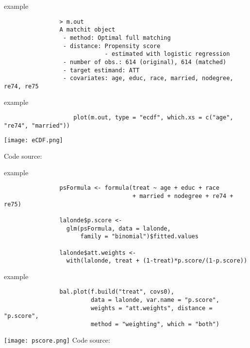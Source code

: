 \documentclass[aspectratio=169]{beamer}
\begin{document}
		\begin{frame}[fragile]{example}
			\begin{verbatim}
				> m.out
				A matchit object
				 - method: Optimal full matching
				 - distance: Propensity score
				             - estimated with logistic regression
				 - number of obs.: 614 (original), 614 (matched)
				 - target estimand: ATT
				 - covariates: age, educ, race, married, nodegree, re74, re75
 	 		\end{verbatim}
		\end{frame}

		\begin{frame}[fragile]{example}
			\begin{verbatim}
					plot(m.out, type = "ecdf", which.xs = c("age", "re74", "married"))
			\end{verbatim}
			\texttt{[image: eCDF.png]}
				\begin{center}
				\tiny{ Code source: \href{https://kosukeimai.github.io/MatchIt/articles/assessing-balance.html}{\underline{}}}
			\end{center}
		\end{frame}

		\begin{frame}[fragile]{example}
			\begin{verbatim}
				psFormula <- formula(treat ~ age + educ + race
				                     + married + nodegree + re74 + re75)

				lalonde$p.score <-
				  glm(psFormula, data = lalonde,
				      family = "binomial")$fitted.values

				lalonde$att.weights <-
				  with(lalonde, treat + (1-treat)*p.score/(1-p.score))
			\end{verbatim}
		\end{frame}

		\begin{frame}[fragile]{example}
			\begin{verbatim}
				bal.plot(f.build("treat", covs0),
				         data = lalonde, var.name = "p.score",
				         weights = "att.weights", distance = "p.score",
				         method = "weighting", which = "both")
			\end{verbatim}
			\begin{center}
				\texttt{[image: pscore.png]}
				\tiny{Code source: \href{https://mran.microsoft.com/snapshot/2017-08-06/web/packages/cobalt/vignettes/cobalt_basic_use.html}{\underline{}}}
			\end{center}
		\end{frame}
\end{document}
